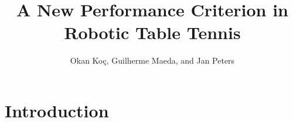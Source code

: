 \documentclass[10pt,a4paper]{article}
\author{Okan Ko\c c, Guilherme Maeda, and Jan Peters}
\title{A New Performance Criterion in Robotic Table Tennis}
\begin{document}
\maketitle


\section{Introduction}


%
%
% 
%
% 
%
%
%
%
%
\end{document}
